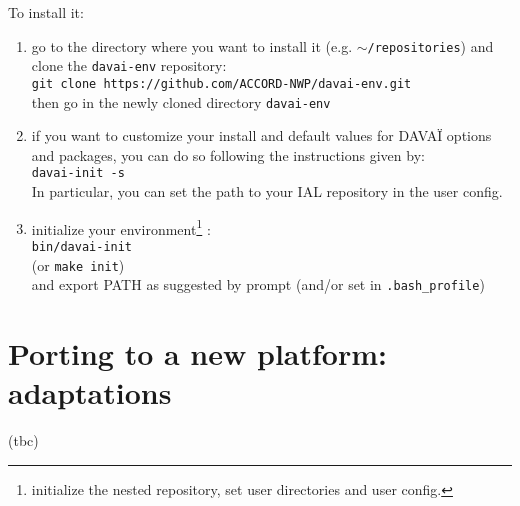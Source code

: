\documentclass[a4paper,10pt,twoside]{article}
\begin{document}
\noindent To install it:
\begin{enumerate}[label=(D.\arabic*)]
 \item go to the directory where you want to install it (e.g. \texttt{$\sim$/repositories}) and\\
       clone the \texttt{davai-env} repository:\\
       \texttt{git clone https://github.com/ACCORD-NWP/davai-env.git}\\
       then go in the newly cloned directory \texttt{davai-env}
 \item if you want to customize your install and default values for DAVAÏ options and packages, you can do so following the instructions given by:\\
       \texttt{davai-init -s}\\
       In particular, you can set the path to your IAL repository in the user config.
 \item initialize your environment\footnote{initialize the nested repository, set user directories and user config.} :\\
       \texttt{bin/davai-init}\\
       (or \texttt{make init})\\
       and export PATH as suggested by prompt (and/or set in \texttt{.bash\_profile})
\end{enumerate}







\newpage
\section{Porting to a new platform: adaptations}
(tbc)
\end{document}
